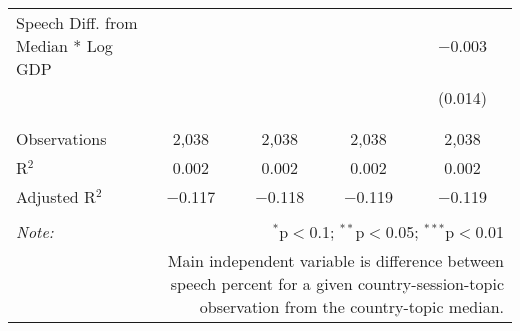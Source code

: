\begin{table}[!htbp]
\begin{tabular}{@{\extracolsep{5pt}}lcccc}
 Speech Diff. from Median * Log GDP &  &  &  & $-$0.003 \\ 
  &  &  &  & (0.014) \\ 
  & & & & \\ 
\hline \\[-1.8ex] 
Observations & 2,038 & 2,038 & 2,038 & 2,038 \\ 
R$^{2}$ & 0.002 & 0.002 & 0.002 & 0.002 \\ 
Adjusted R$^{2}$ & $-$0.117 & $-$0.118 & $-$0.119 & $-$0.119 \\ 
\hline 
\hline \\[-1.8ex] 
\textit{Note:}  & \multicolumn{4}{r}{$^{*}$p$<$0.1; $^{**}$p$<$0.05; $^{***}$p$<$0.01} \\ 
 & \multicolumn{4}{r}{Main independent variable is difference between speech percent for a given country-session-topic observation from the country-topic median.} \\ 
\end{tabular} 
\end{table} 
